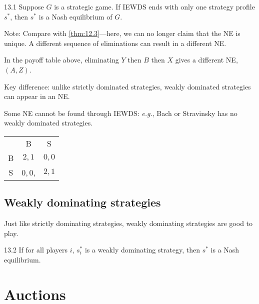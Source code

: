 \documentclass[12pt,letterpaper]{report}
\begin{document}
\begin{thm}{}{13.1}
  Suppose $G$ is a strategic game.
  If IEWDS ends with only one strategy profile $s^*$, then $s^*$ is a Nash equilibrium of $G$.
\end{thm}

Note: Compare with \cref{thm:12.3}---here, we can no longer claim that the NE is unique.
A different sequence of eliminations can result in a different NE.

\begin{ex}
  In the payoff table above, eliminating $Y$ then $B$ then $X$ gives a different NE, $(A, Z)$.
\end{ex}

Key difference: unlike strictly dominated strategies, weakly dominated strategies can appear in an
NE.

\begin{minipage}{0.6\textwidth}
  Some NE cannot be found through IEWDS: \emph{e.g.}, Bach or Stravinsky has no weakly dominated
  strategies.
\end{minipage}\hfill\begin{minipage}{0.4\textwidth}
  \centering
  \renewcommand{\arraystretch}{1.25}
  \begin{tabular}{c |c|c|}
    \multicolumn{1}{c}{} & \multicolumn{1}{c}{B} & \multicolumn{1}{c}{S} \\
    \cline{2-3}
    B & $2, 1$ & $0, 0$ \\
    \cline{2-3}
    S & $0, 0$, & $2, 1$ \\
    \cline{2-3}
  \end{tabular}
\end{minipage}

\pagebreak
\subsection{Weakly dominating strategies}

Just like strictly dominating strategies, weakly dominating strategies are good to play.

\begin{lem}{}{13.2}
  If for all players $i$, $s_i^*$ is a weakly dominating strategy, then $s^*$ is a Nash equilibrium.
\end{lem}

\section{Auctions}
\end{document}
